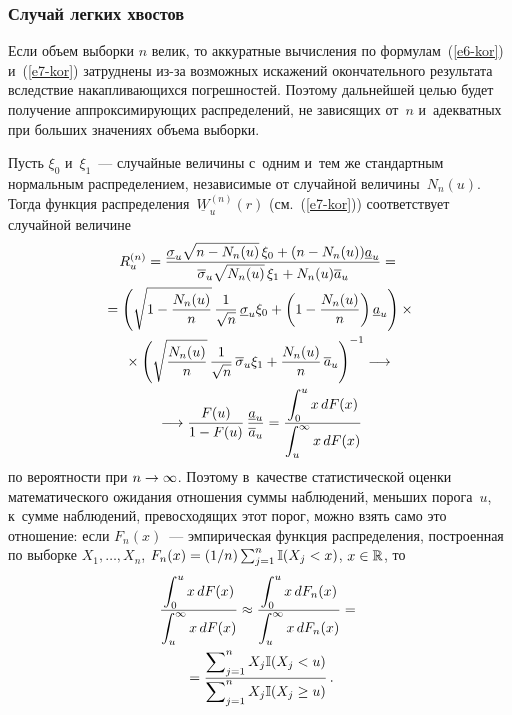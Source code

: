 \begin{multicols}{2}

\subsubsection{Случай легких хвостов}

Если объем выборки $n$ велик, то аккуратные вычисления по формулам~(\ref{e6-kor}) 
и~(\ref{e7-kor}) затруднены из-за возможных искажений окончательного
 результата вследствие накапливающихся погрешностей. Поэтому дальнейшей 
 целью будет получение аппроксимирующих распределений, не зависящих от~$n$ 
 и~адекватных при больших значениях объема выборки.

Пусть $\xi_0$ и~$\xi_1$~--- %
случайные величины с~одним и~тем же 
стандартным нормальным распределением, независимые от случайной 
величины~$N_n(u)$. Тогда функция распределения~$\underline{W}_u^{(n)}(r)$ 
(см.~(\ref{e7-kor})) соответствует случайной величине
\begin{multline*}
R_u^{(n)}=\displaystyle\frac{\displaystyle \underline{\sigma}_u\sqrt{n-N_n(u)}
\,\xi_0+(n-N_n(u))\underline{a}_u\mathstrut}{\displaystyle \overline{\sigma}_u\sqrt{N_n(u)}\,\xi_1+N_n(u)\overline{a}_u\mathstrut}={}\\
{}=
\left({\sqrt{1-\displaystyle\frac{\displaystyle N_n(u)\mathstrut}{\displaystyle n\mathstrut}}\,\displaystyle\frac{\displaystyle 1\mathstrut}{\displaystyle \sqrt{n}\mathstrut} \,
\underline{\sigma}_u \xi_0+\left(1-\displaystyle\frac{\displaystyle N_n(u)\mathstrut}{\displaystyle n\mathstrut}\right)\underline{a}_u}\right)\times{}\\
{}\times
\left(
{\sqrt{\displaystyle\frac{\displaystyle N_n(u)\mathstrut}{\displaystyle n\mathstrut}}\, \displaystyle\frac{\displaystyle 1\mathstrut}{\displaystyle \sqrt{n}\mathstrut}\,
\overline{\sigma}_u \xi_1+ \displaystyle\frac{\displaystyle N_n(u)\mathstrut}{\displaystyle n\mathstrut}\, \overline{a}_u}\right)^{-1}
\longrightarrow
{}\\
{}\longrightarrow
\displaystyle\frac{\displaystyle F(u)\mathstrut}{\displaystyle 1-F(u)\mathstrut}\, \displaystyle\frac{\displaystyle \underline{a}_u\mathstrut}{\displaystyle \overline{a}_u\mathstrut}=
\displaystyle\frac{\displaystyle \int\nolimits_{0}^{u}x\,dF(x)\mathstrut}{\displaystyle \int\nolimits_{u}^{\infty}x\,dF(x)\mathstrut}
\end{multline*}
по вероятности при $n\hm\to\infty$. Поэтому в~качестве статистической 
оценки математического ожидания отношения суммы наблюдений, меньших порога~$u$, 
к~сумме наблюдений, превосходящих этот порог, можно взять само это отношение: 
если $F_n(x)$~--- эмпирическая функция распределения, построенная по 
выборке $X_1,\ldots,X_n$, $F_n(x)\hm=({1}/{n})\sum\nolimits_{j=1}^n
\mathbb{I}(X_j<x)$, $x\hm\in\mathbb{R}$,
то
\begin{multline*}
\displaystyle\frac{\displaystyle \int\nolimits_{0}^{u}x\,dF(x)\mathstrut}{\displaystyle \int\nolimits_{u}^{\infty}x\,dF(x)\mathstrut}\approx
\displaystyle\frac{\displaystyle \int\nolimits_{0}^{u}x\,dF_n(x)\mathstrut}{\displaystyle \int\nolimits_{u}^{\infty}x\,dF_n(x)\mathstrut}={}\\
{}=
\displaystyle\frac{\displaystyle \sum\nolimits_{j=1}^nX_j\mathbb{I}(X_j<u)\mathstrut}{\displaystyle \sum\nolimits_{j=1}^nX_j\mathbb{I}(X_j\ge u)\mathstrut}\,.
\end{multline*}


\end{multicols}
